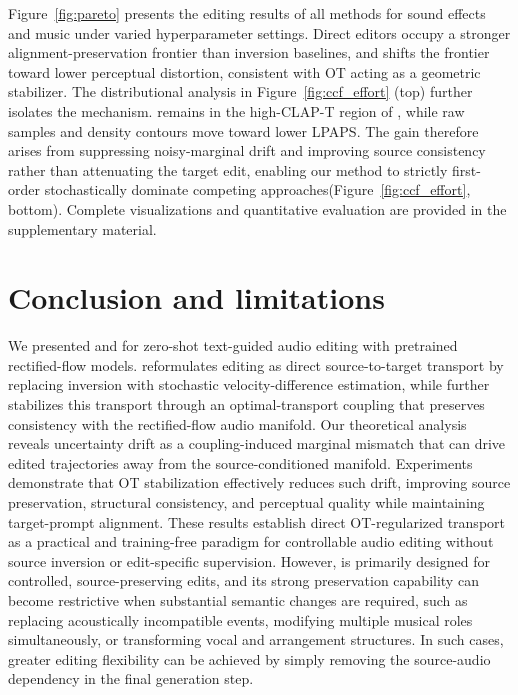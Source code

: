 Figure~\ref{fig:pareto} presents the editing results of all methods for sound effects and music under varied hyperparameter settings.
Direct editors occupy a stronger alignment-preservation frontier than inversion baselines, and \methodplus shifts the frontier toward lower perceptual distortion, consistent with OT acting as a geometric stabilizer.
The distributional analysis in Figure~\ref{fig:ccf_effort} (top) further isolates the mechanism.
\methodplus remains in the high-CLAP-T region of \method, while raw samples and density contours move toward lower LPAPS.
The gain therefore arises from suppressing noisy-marginal drift and improving source consistency rather than attenuating the target edit, enabling our method to strictly first-order stochastically dominate competing approaches(Figure~\ref{fig:ccf_effort}, bottom).
Complete visualizations and quantitative evaluation are provided in the supplementary material.

\section{Conclusion and limitations}

We presented \method and \methodplus for zero-shot text-guided audio editing with pretrained rectified-flow models.
\method reformulates editing as direct source-to-target transport by replacing inversion with stochastic velocity-difference estimation, while \methodplus further stabilizes this transport through an optimal-transport coupling that preserves consistency with the rectified-flow audio manifold.
Our theoretical analysis reveals uncertainty drift as a coupling-induced marginal mismatch that can drive edited trajectories away from the source-conditioned manifold.
Experiments demonstrate that OT stabilization effectively reduces such drift, improving source preservation, structural consistency, and perceptual quality while maintaining target-prompt alignment.
These results establish direct OT-regularized transport as a practical and training-free paradigm for controllable audio editing without source inversion or edit-specific supervision.
However, \methodplus is primarily designed for controlled, source-preserving edits, and its strong preservation capability can become restrictive when substantial semantic changes are required, such as replacing acoustically incompatible events, modifying multiple musical roles simultaneously, or transforming vocal and arrangement structures. 
In such cases, greater editing flexibility can be achieved by simply removing the source-audio dependency in the final generation step.

